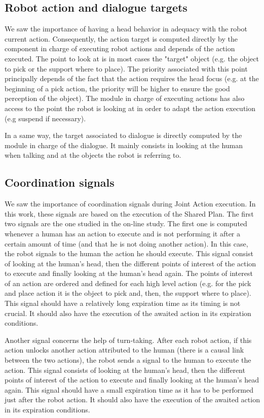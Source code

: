 \documentclass[english,a4paper,11pt,twoside]{StyleThese}
\begin{document}
\subsection{Robot action and dialogue targets}

We saw the importance of having a head behavior in adequacy with the robot current action. Consequently, the action target is computed directly by the component in charge of executing robot actions and depends of the action executed. The point to look at is in most cases the "target" object (e.g. the object to pick or the support where to place). The priority associated with this point principally depends of the fact that the action requires the head focus (e.g. at the beginning of a pick action, the priority will be higher to ensure the good perception of the object). The module in charge of executing actions has also access to the point the robot is looking at in order to adapt the action execution (e.g suspend if necessary).

In a same way, the target associated to dialogue is directly computed by the module in charge of the dialogue. It mainly consists in looking at the human when talking and at the objects the robot is referring to.

\subsection{Coordination signals}

We saw the importance of coordination signals during Joint Action execution. In this work, these signals are based on the execution of the Shared Plan. The first two signals are the one studied in the on-line study. The first one is computed whenever a human has an action to execute and is not performing it after a certain amount of time (and that he is not doing another action). In this case, the robot signals to the human the action he should execute. This signal consist of looking at the human's head, then the different points of interest of the action to execute and finally looking at the human's head again. The points of interest of an action are ordered and defined for each high level action (e.g. for the pick and place action it is the object to pick and, then, the support where to place). This signal should have a relatively long expiration  time as its timing is not crucial. It should also have the execution of the awaited action in its expiration conditions.

Another signal concerns the help of turn-taking. After each robot action, if this action unlocks another action attributed to the human (there is a causal link between the two actions), the robot sends a signal to the human to execute the action. This signal consists of looking at the human's head, then the different points of interest of the action to execute and finally looking at the human's head again. This signal should have a small expiration time as it has to be performed just after the robot action. It should also have the execution of the awaited action in its expiration conditions.
\end{document}
